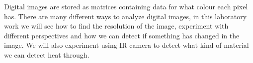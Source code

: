 Digital images are stored as matrices containing data for what colour each pixel has. There are many different ways to analyze digital images, in this laboratory work we will see how to find the resolution of the image, experiment with different perspectives and how we can detect if something has changed in the image. We will also experiment using IR camera to detect what kind of material we can detect heat through.